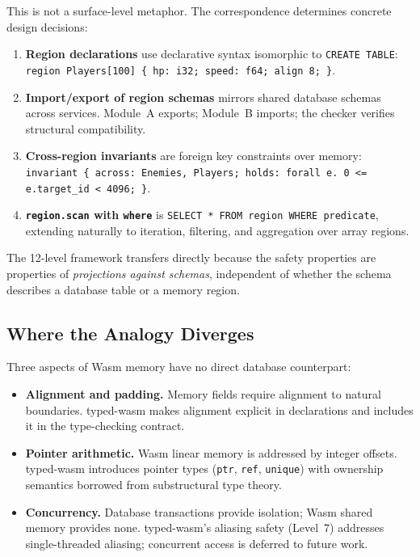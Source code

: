 \documentclass[sigplan,nonacm,screen]{acmart}
\begin{document}
This is not a surface-level metaphor. The correspondence determines
concrete design decisions:

\begin{enumerate}
  \item \textbf{Region declarations} use declarative syntax isomorphic to
    \texttt{CREATE TABLE}:
    \texttt{region Players[100] \{ hp: i32; speed: f64; align 8; \}}.

  \item \textbf{Import/export of region schemas} mirrors shared database
    schemas across services. Module~A exports; Module~B imports; the
    checker verifies structural compatibility.

  \item \textbf{Cross-region invariants} are foreign key constraints over
    memory: \texttt{invariant \{ across: Enemies, Players; holds: forall
    e.\ 0 <= e.target\_id < 4096; \}}.

  \item \textbf{\texttt{region.scan} with \texttt{where}} is
    \texttt{SELECT * FROM region WHERE predicate}, extending naturally to
    iteration, filtering, and aggregation over array regions.
\end{enumerate}

The 12-level framework transfers directly because the safety properties
are properties of \emph{projections against schemas}, independent of
whether the schema describes a database table or a memory region.

\subsection{Where the Analogy Diverges}

Three aspects of Wasm memory have no direct database counterpart:

\begin{itemize}
  \item \textbf{Alignment and padding.} Memory fields require alignment to
    natural boundaries. typed-wasm makes alignment explicit in declarations
    and includes it in the type-checking contract.

  \item \textbf{Pointer arithmetic.} Wasm linear memory is addressed by
    integer offsets. typed-wasm introduces pointer types (\texttt{ptr},
    \texttt{ref}, \texttt{unique}) with ownership semantics borrowed from
    substructural type theory.

  \item \textbf{Concurrency.} Database transactions provide isolation; Wasm
    shared memory provides none. typed-wasm's aliasing safety (Level~7)
    addresses single-threaded aliasing; concurrent access is deferred to
    future work.
\end{itemize}
\end{document}
